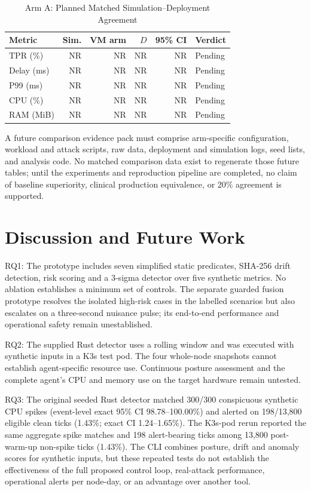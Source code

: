 \documentclass{ieeeaccess}
\renewcommand{\textbf}[1]{#1}
\begin{document}
\begin{table}[ht]
\caption{Arm A: Planned Matched Simulation--Deployment Agreement}
\label{tab:validation_results}
\centering
\footnotesize
\setlength{\tabcolsep}{3pt}
\begin{tabular}{@{}lrrrrl@{}}
\toprule
\textbf{Metric} & \textbf{Sim.} & \textbf{VM arm} & \textbf{$D$} & \textbf{95\% CI} & \textbf{Verdict} \\
\midrule
TPR (\%) & NR & NR & NR & NR & Pending \\
Delay (ms) & NR & NR & NR & NR & Pending \\
P99 (ms) & NR & NR & NR & NR & Pending \\
CPU (\%) & NR & NR & NR & NR & Pending \\
RAM (MiB) & NR & NR & NR & NR & Pending \\
\bottomrule
\end{tabular}
\end{table}

A future comparison evidence pack must comprise arm-specific configuration, workload and attack scripts, raw data, deployment and simulation logs, seed lists, and analysis code. No matched comparison data exist to regenerate those future tables; until the experiments and reproduction pipeline are completed, no claim of baseline superiority, clinical production equivalence, or 20\% agreement is supported.

\section{Discussion and Future Work}
\label{sec:discussion}

{RQ1:} The prototype includes seven simplified static predicates, SHA-256 drift detection, risk scoring and a 3-sigma detector over five synthetic metrics. No ablation establishes a minimum set of controls. The separate guarded fusion prototype resolves the isolated high-risk cases in the labelled scenarios but also escalates on a three-second nuisance pulse; its end-to-end performance and operational safety remain unestablished.

{RQ2:} The supplied Rust detector uses a rolling window and was executed with synthetic inputs in a K3s test pod. The four whole-node snapshots cannot establish agent-specific resource use. Continuous posture assessment and the complete agent's CPU and memory use on the target hardware remain untested.

{RQ3:} The original seeded Rust detector matched 300/300 conspicuous synthetic CPU spikes (event-level exact 95\% CI 98.78--100.00\%) and alerted on 198/13,800 eligible clean ticks (1.43\%; exact CI 1.24--1.65\%). The K3s-pod rerun reported the same aggregate spike matches and 198 alert-bearing ticks among 13,800 post-warm-up non-spike ticks (1.43\%). The CLI combines posture, drift and anomaly scores for synthetic inputs, but these repeated tests do not establish the effectiveness of the full proposed control loop, real-attack performance, operational alerts per node-day, or an advantage over another tool.
\end{document}
